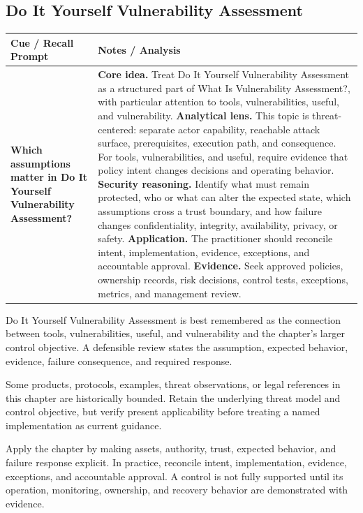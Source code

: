 \documentclass[11pt]{article}
\newcommand{\CornellHeader}{%
\rowcolor{Navy}\color{white}\bfseries Cue / Recall Prompt & \color{white}\bfseries Notes / Analysis\\\hline}
\newcommand{\CornellRow}[2]{%
\cellcolor{CueGray}\RaggedRight\textbf{#1} & \RaggedRight #2\\\hline}
\begin{document}
\subsection*{Do It Yourself Vulnerability Assessment}
\begin{longtable}{>{\RaggedRight\arraybackslash}p{}|>{\RaggedRight\arraybackslash}p{}}
\CornellHeader
\CornellRow{Which assumptions matter in Do It Yourself Vulnerability Assessment?}{\textbf{Core idea.} Treat Do It Yourself Vulnerability Assessment as a structured part of What Is Vulnerability Assessment?, with particular attention to tools, vulnerabilities, useful, and vulnerability. \textbf{Analytical lens.} This topic is threat-centered: separate actor capability, reachable attack surface, prerequisites, execution path, and consequence. For tools, vulnerabilities, and useful, require evidence that policy intent changes decisions and operating behavior. \textbf{Security reasoning.} Identify what must remain protected, who or what can alter the expected state, which assumptions cross a trust boundary, and how failure changes confidentiality, integrity, availability, privacy, or safety. \textbf{Application.} The practitioner should reconcile intent, implementation, evidence, exceptions, and accountable approval. \textbf{Evidence.} Seek approved policies, ownership records, risk decisions, control tests, exceptions, metrics, and management review.}
\end{longtable}
\begin{topicsummary}
Do It Yourself Vulnerability Assessment is best remembered as the connection between tools, vulnerabilities, useful, and vulnerability and the chapter's larger control objective. A defensible review states the assumption, expected behavior, evidence, failure consequence, and required response.
\end{topicsummary}
\begin{historybox}
Some products, protocols, examples, threat observations, or legal references in this chapter are historically bounded. Retain the underlying threat model and control objective, but verify present applicability before treating a named implementation as current guidance.
\end{historybox}
\begin{defensebox}
Apply the chapter by making assets, authority, trust, expected behavior, and failure response explicit. In practice, reconcile intent, implementation, evidence, exceptions, and accountable approval. A control is not fully supported until its operation, monitoring, ownership, and recovery behavior are demonstrated with evidence.
\end{defensebox}
\end{document}
